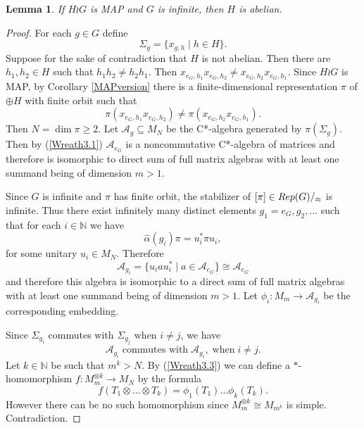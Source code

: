 \documentclass[11 pt, leqno, hidelinks]{amsart}%
\theoremstyle{plain}
\newtheorem{lemma}[theorem]{Lemma}
\numberwithin{equation}{section}
\newcommand{\N}{\mathbb{N}}
\newcommand{\Rep}{\textup{Rep}}
\begin{document}
\begin{lemma}\label{Wreath3} If $H\wr G$ is MAP and $G$ is infinite, then $H$ is abelian.
\end{lemma}
\begin{proof} For each $g \in G$ define
$$\Sigma_g = \{x_{g, h}\;|\; h\in H\}.$$
  Suppose for the sake of contradiction that $H$ is not abelian. Then there are $h_1, h_2 \in H$ such that $h_1h_2 \neq h_2h_1$. Then
$x_{e_G, h_1}x_{e_G, h_2}\neq x_{e_G, h_2}x_{e_G, h_1}$. Since $H\wr G$ is MAP, by Corollary \ref{MAPversion} there is a finite-dimensional representation $\pi$ of $\oplus H$ with finite orbit such that
\begin{equation}\label{Wreath3.1} \pi(x_{e_G, h_1}x_{e_G, h_2})\neq \pi(x_{e_G, h_2}x_{e_G, h_1}).\end{equation}
Then $N = \dim \pi \ge 2$. Let $\mathcal A_g \subseteq M_N$ be the C*-algebra generated by  $\pi(\Sigma_g)$. Then by (\ref{Wreath3.1}) $\mathcal A_{e_G}$ is a noncommutative C*-algebra of matrices and therefore is isomorphic to direct sum of full matrix algebras with at least one summand being of dimension $m> 1$.


Since $G$ is infinite and $\pi$ has finite orbit, the stabilizer of $[\pi] \in \Rep(G)/_{\approx}$ is infinite. Thus there exist infinitely many distinct elements $g_1 = e_G, g_2, \ldots$ such that for each $i \in \N$ we have
\begin{equation}\label{Wreath3.2} \hat\alpha(g_i)\pi = u_i^*\pi u_i,\end{equation}
for some unitary $u_i\in M_N$. Therefore
$$\mathcal A_{g_i} = \{u_iau_i^*\;|\; a\in \mathcal A_{e_G}\} \cong \mathcal A_{e_G}$$ and  therefore this algebra is isomorphic to a direct sum of full matrix algebras with at least one summand being of dimension $m> 1$. Let  $\phi_i: M_m \to \mathcal A_{g_i}$ be the corresponding embedding.

 Since $\Sigma_{g_i}$ commutes with $\Sigma_{g_j}$ when $i\neq j$, we have
\begin{equation}\label{Wreath3.3} \mathcal A_{g_i} \;\text{commutes with}\;  \mathcal A_{g_i}, \; \text{when}\; i\neq j.\end{equation}
Let $k\in \mathbb N$ be such that $m^k > N$. By (\ref{Wreath3.3}) we can define a $\ast$-homomorphism $f:  M_m^{\otimes k} \to M_N$ by the formula
$$f(T_1\otimes \ldots \otimes T_k) = \phi_1(T_1)\ldots \phi_k(T_k).$$ However there can be no such homomorphism since $M_m^{\otimes k}  \cong M_{m^k}$ is simple. Contradiction.
\end{proof}
\end{document}
